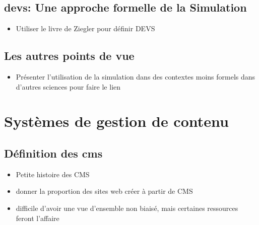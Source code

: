 \documentclass{rapport_stage}
\begin{document}


\subsection*{\gls{devs}: Une approche formelle de la Simulation }

\begin{itemize}[label=$\bullet$]
  \item Utiliser le livre de Ziegler pour définir DEVS \cite{zeigler_theory_2019}
\end{itemize}

\subsection*{Les autres points de vue}

\begin{itemize}[label=$\bullet$]
  \item Présenter l'utilisation de la simulation dans des contextes moins formels dans d'autres sciences pour faire le lien
\end{itemize}

\section{Systèmes de gestion de contenu}


\subsection*{Définition des \gls{cms}}

\begin{itemize}[label=$\bullet$]
  \item Petite histoire des CMS
  \item donner la proportion des sites web créer à partir de CMS
  \item difficile d'avoir une vue d'ensemble non biaisé, mais certaines ressources feront l'affaire \cite{barker_web_2016}
\end{itemize}
\end{document}
